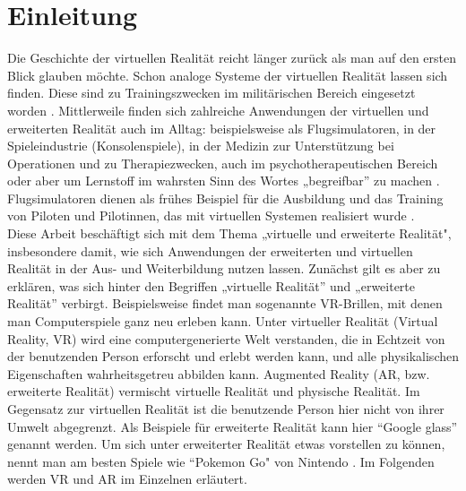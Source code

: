 \documentclass[deutsch]{llncs}
\begin{document}
\tableofcontents
\newpage
{}
\section{Einleitung}
\label{sec:intro}
Die Geschichte der virtuellen Realität reicht länger zurück als man auf den ersten Blick glauben möchte. Schon analoge Systeme der virtuellen Realität lassen sich finden. Diese sind zu Trainingszwecken im militärischen Bereich eingesetzt worden \cite{vrnerds}.
Mittlerweile finden sich zahlreiche Anwendungen der virtuellen und erweiterten Realität auch im Alltag: beispielsweise als Flugsimulatoren, in der Spieleindustrie (Konsolenspiele), in der Medizin zur Unterstützung bei Operationen und zu Therapiezwecken, auch im psychotherapeutischen Bereich oder aber um Lernstoff im wahrsten Sinn des Wortes „begreifbar'' zu machen \cite{Klampfer}. 
Flugsimulatoren dienen als frühes Beispiel für die Ausbildung und das Training von Piloten und Pilotinnen, das mit virtuellen Systemen realisiert wurde  \cite{Klampfer}.\\

Diese Arbeit beschäftigt sich mit dem Thema „virtuelle und erweiterte Realität", insbesondere damit, wie sich Anwendungen der erweiterten und virtuellen Realität in der Aus- und Weiterbildung nutzen lassen. 
Zunächst gilt es aber zu erklären, was sich hinter den Begriffen „virtuelle Realität'' und „erweiterte Realität'' verbirgt. 
Beispielsweise findet man sogenannte VR-Brillen, mit denen man Computerspiele ganz neu erleben kann.
\label{sec:typo}
Unter virtueller Realität (Virtual Reality, VR) wird eine computergenerierte Welt verstanden, die in Echtzeit von der benutzenden Person erforscht und erlebt werden kann, und alle physikalischen Eigenschaften wahrheitsgetreu abbilden kann. 
Augmented Reality (AR, bzw. erweiterte Realität) vermischt virtuelle Realität und physische Realität. Im Gegensatz zur virtuellen Realität ist die benutzende Person hier nicht von ihrer Umwelt abgegrenzt.
Als Beispiele für erweiterte Realität kann hier ``Google glass'' genannt werden. 
Um sich unter erweiterter Realität etwas vorstellen zu können, nennt man am besten Spiele wie ``Pokemon Go"  von Nintendo \cite{Klampfer}. Im Folgenden werden VR und AR im Einzelnen erläutert.\\
\end{document}
